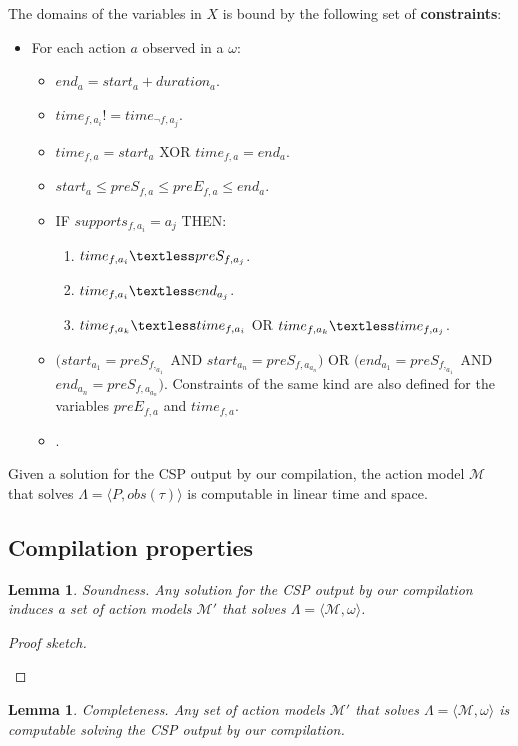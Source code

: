 \documentclass[letterpaper]{article} %
\newcommand{\tup}[1]{{\langle #1 \rangle}}
\newtheorem{lemma}[theorem]{Lemma}
\begin{document}
The domains of the variables in $X$ is bound by the following set of {\bf constraints}:
\begin{itemize}
\item For each action $a$ observed in a $\omega$:
\begin{itemize}
\item $end_a = start_a + duration_a$.
\item $time_{f,a_i}!=time_{\neg f,a_j}$.
\item $time_{f,a}= start_a$ XOR $time_{f,a}= end_a$.
\item $start_a\leq preS_{f,a}\leq preE_{f,a}\leq end_a$.
\item IF $supports_{f,a_i}=a_j$ THEN:
\begin{enumerate}
\item $time_{f,a_i}\textless  preS_{f,a_j}$.
\item $time_{f,a_i}\textless  end_{a_j}$.
\item $time_{f,a_k}\textless time_{f,a_i}$ OR $time_{f,a_k}\textless time_{f,a_j}$.
\end{enumerate}
\item $(start_{a_1} = preS_{f,_{a_1}}$ AND $start_{a_n} = preS_{f,a_{a_n}})$ OR $(end_{a_1} = preS_{f,_{a_1}}$ AND $end_{a_n} = preS_{f,a_{a_n}})$. Constraints of the same kind are also defined for the variables $preE_{f,a}$ and $time_{f,a}$.
\item .
\end{itemize}
\end{itemize}

Given a solution for the CSP output by our compilation, the action model $\mathcal{M}$ that solves $\Lambda=\tup{P,obs(\tau)}$ is computable in linear time and space. 


\subsection{Compilation properties}
\begin{lemma}
Soundness. Any solution for the CSP output by our compilation induces a set of action models $\mathcal{M}'$ that solves $\Lambda=\tup{\mathcal{M},\omega}$.
\end{lemma}

\begin{proof}[Proof sketch]
\begin{small}
\end{small}
\end{proof}

\begin{lemma}
Completeness. Any set of action models $\mathcal{M}'$ that solves $\Lambda=\tup{\mathcal{M},\omega}$ is computable solving the CSP output by our compilation.
\end{lemma}
\end{document}
